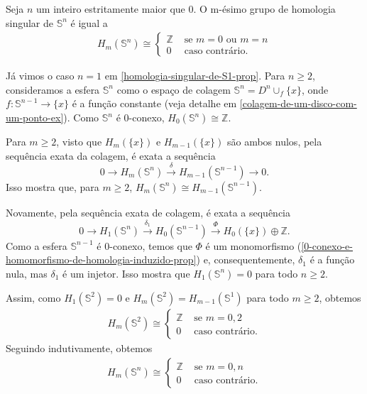 \begin{prop}
    Seja $n$ um inteiro estritamente maior que $0$. O m-ésimo grupo de homologia singular de $\mathbb{S}^n$ é igual a  
    \begin{align*}
        H_m(\mathbb{S}^n)\cong\begin{cases}
            \mathbb{Z}&\text{ se }m=0\text{ ou }m=n\\
            0&\text{ caso contrário.}
        \end{cases}
    \end{align*}
\end{prop}

\begin{dem}
    Já vimos o caso $n=1$ em \ref{homologia-singular-de-S1-prop}. Para $n\ge 2$, consideramos a esfera $\mathbb{S}^n$ como o espaço de colagem $\mathbb{S}^n=D^n\cup_f\{x\}$, onde $f:\mathbb{S}^{n-1}\rightarrow \{x\}$ é a função constante (veja detalhe em \ref{colagem-de-um-disco-com-um-ponto-ex}). Como $\mathbb{S}^n$ é 0-conexo, $H_0(\mathbb{S}^n)\cong \mathbb{Z}$.
    
    Para $m\ge 2$, visto que $H_m(\{x\})$ e $H_{m-1}(\{x\})$ são ambos nulos, pela sequência exata da colagem, é exata a sequência 
    \[0\rightarrow H_m(\mathbb{S}^n)\xrightarrow{\delta} H_{m-1}(\mathbb{S}^{n-1})\rightarrow 0.\]
    Isso mostra que, para $m\ge 2$, $H_m(\mathbb{S}^n)\cong H_{m-1}(\mathbb{S}^{n-1}).$

    Novamente, pela sequência exata de colagem, é exata a sequência 
    \[0\rightarrow H_1(\mathbb{S}^n)\xrightarrow{\delta_1} H_0(\mathbb{S}^{n-1})\xrightarrow{\Phi} H_0(\{x\})\oplus \mathbb{Z}.\]
    Como a esfera $\mathbb{S}^{n-1}$ é 0-conexo, temos que $\Phi$ é um monomorfismo (\ref{0-conexo-e-homomorfismo-de-homologia-induzido-prop}) e, consequentemente, $\delta_1$ é a função nula, mas $\delta_1$ é um injetor. Isso mostra que $H_1(\mathbb{S}^n)=0$ para todo $n\ge 2$.

    Assim, como $H_1(\mathbb{S}^2)=0$ e $H_m(\mathbb{S}^2)=H_{m-1}(\mathbb{S}^1)$ para todo $m\ge 2$, obtemos 
    \begin{align*}
        H_m(\mathbb{S}^2)\cong\begin{cases}
            \mathbb{Z}&\text{ se }m=0,2\\
            0&\text{ caso contrário.}
        \end{cases}
    \end{align*}
    Seguindo indutivamente, obtemos 
    \begin{align*}
        H_m(\mathbb{S}^n)\cong\begin{cases}
            \mathbb{Z}&\text{ se }m=0,n\\
            0&\text{ caso contrário.}
        \end{cases}
    \end{align*}
\end{dem}

